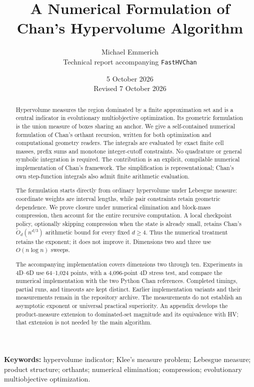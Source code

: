 \documentclass[12pt,a4paper]{article}
\title{A Numerical Formulation of\\Chan's Hypervolume Algorithm}
\author{Michael Emmerich\\[.3em]
\small Technical report accompanying \texttt{FastHVChan}}
\date{5 October 2026\\\small Revised 7 October 2026}
\theoremstyle{definition}
\newcommand{\wtO}{\widetilde O}
\begin{document}
\maketitle
\begin{abstract}
Hypervolume measures the region dominated by a finite approximation set and
is a central indicator in evolutionary multiobjective optimization. Its
geometric formulation is the union measure of boxes sharing an anchor.
We give a self-contained numerical formulation of Chan's orthant recursion,
written for both optimization and computational geometry readers. The
integrals are evaluated by exact finite cell masses, prefix sums and
monotone integer-cutoff constraints. No quadrature or general symbolic
integration is required. The contribution is an explicit, compilable
numerical implementation of Chan's framework. The simplification is
representational; Chan's own step-function integrals also admit finite
arithmetic evaluation.

The formulation starts directly from ordinary hypervolume under Lebesgue
measure: coordinate weights are interval lengths, while pair constraints
retain geometric dependence. We prove closure under numerical elimination and block-mass
compression, then account for the entire recursive computation. A local
checkpoint policy, optionally skipping compression when the state is
already small, retains Chan's $\wtO_d(n^{d/3})$ arithmetic bound for every
fixed $d\ge4$. Thus the numerical treatment retains the exponent; it does
not improve it. Dimensions two and three use $O(n\log n)$ sweeps.

The accompanying implementation covers dimensions two through ten.
Experiments in 4D--6D use 64--1,024 points, with a 4,096-point 4D stress
test, and compare the numerical implementation with the two Python
Chan references. Completed timings, partial runs, and
timeouts are kept distinct. Earlier implementation variants and their
measurements remain in the repository archive. The measurements do not establish an asymptotic
exponent or universal practical superiority. An appendix develops the
product-measure extension to dominated-set magnitude and its equivalence
with HV; that extension is not needed by the main algorithm.
\end{abstract}
\vspace{.3em}
\noindent\textbf{Keywords:} hypervolume indicator; Klee's measure problem;
Lebesgue measure; product structure; orthants; numerical elimination;
compression; evolutionary multiobjective optimization.
\newpage
\tableofcontents
\newpage
\end{document}
